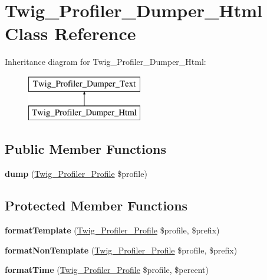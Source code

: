 \hypertarget{classTwig__Profiler__Dumper__Html}{}\section{Twig\+\_\+\+Profiler\+\_\+\+Dumper\+\_\+\+Html Class Reference}
\label{classTwig__Profiler__Dumper__Html}
Inheritance diagram for Twig\+\_\+\+Profiler\+\_\+\+Dumper\+\_\+\+Html\+:\begin{figure}[H]
\begin{center}
\leavevmode
\includegraphics[height=2.000000cm]{classTwig__Profiler__Dumper__Html}
\end{center}
\end{figure}
\subsection*{Public Member Functions}
\begin{DoxyCompactItemize}
\item 
{\bfseries dump} (\hyperlink{classTwig__Profiler__Profile}{Twig\+\_\+\+Profiler\+\_\+\+Profile} \$profile)\hypertarget{classTwig__Profiler__Dumper__Html_a116ca4c5608ae48416551de498ccf4f2}{}\label{classTwig__Profiler__Dumper__Html_a116ca4c5608ae48416551de498ccf4f2}

\end{DoxyCompactItemize}
\subsection*{Protected Member Functions}
\begin{DoxyCompactItemize}
\item 
{\bfseries format\+Template} (\hyperlink{classTwig__Profiler__Profile}{Twig\+\_\+\+Profiler\+\_\+\+Profile} \$profile, \$prefix)\hypertarget{classTwig__Profiler__Dumper__Html_ab3bfbac53e6e2a928672d4186ab174d0}{}\label{classTwig__Profiler__Dumper__Html_ab3bfbac53e6e2a928672d4186ab174d0}

\item 
{\bfseries format\+Non\+Template} (\hyperlink{classTwig__Profiler__Profile}{Twig\+\_\+\+Profiler\+\_\+\+Profile} \$profile, \$prefix)\hypertarget{classTwig__Profiler__Dumper__Html_a537cff8d66a1567410bcd108aa49b467}{}\label{classTwig__Profiler__Dumper__Html_a537cff8d66a1567410bcd108aa49b467}

\item 
{\bfseries format\+Time} (\hyperlink{classTwig__Profiler__Profile}{Twig\+\_\+\+Profiler\+\_\+\+Profile} \$profile, \$percent)\hypertarget{classTwig__Profiler__Dumper__Html_ae190aff533b0d1485227b4921f909f04}{}\label{classTwig__Profiler__Dumper__Html_ae190aff533b0d1485227b4921f909f04}

\end{DoxyCompactItemize}


